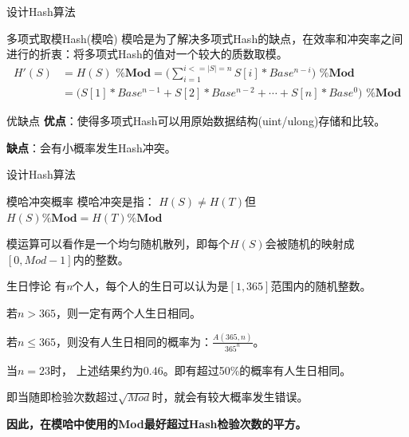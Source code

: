 \documentclass{ctexbeamer}		%
\begin{document}
\begin{frame}{设计Hash算法}

\begin{block}{多项式取模Hash(模哈)}
模哈是为了解决多项式Hash的缺点，在效率和冲突率之间进行的折衷：将多项式Hash的值对一个较大的质数取模。
\begin{align*}
H'(S) &=H(S)\textbf{ \%Mod} = \textbf{(}\sum_{i=1}^{i<=|S| = n}{S[i] * Base^{n - i}}\textbf{) \%Mod} \\
&= \textbf{(}S[1] * Base^{n-1} + S[2] * Base^{n-2} + \cdots + S[n] * Base^0\textbf{) \%Mod}
\end{align*}

\end{block}

\pause

\begin{block}{优缺点}
\textbf{优点}：使得多项式Hash可以用原始数据结构(uint/ulong)存储和比较。

\textbf{缺点}：会有小概率发生Hash冲突。
\end{block}

\end{frame}

\begin{frame}{设计Hash算法}
    

\begin{block}{模哈冲突概率}
模哈冲突是指：
$H(S) \neq H(T)$但$H(S) \textbf{\%Mod} = H(T) \textbf{\% Mod}$

模运算可以看作是一个均匀随机散列，即每个$H(S)$会被随机的映射成$[0, Mod-1]$内的整数。

\end{block}

\pause

\begin{block}{生日悖论}
有\textit{n}个人，每个人的生日可以认为是$[1, 365]$范围内的随机整数。

若$n>365$，则一定有两个人生日相同。

若$n \leq 365$，则没有人生日相同的概率为：$\frac{A(365,n)}{365^n}$。

当$n = 23$时， 上述结果约为$0.46$。即有超过50\%的概率有人生日相同。

\pause

即当随即检验次数超过$\sqrt{Mod}$时，就会有较大概率发生错误。

\textbf{因此，在模哈中使用的Mod最好超过Hash检验次数的平方。}
\end{block}

\end{frame}
\end{document}
